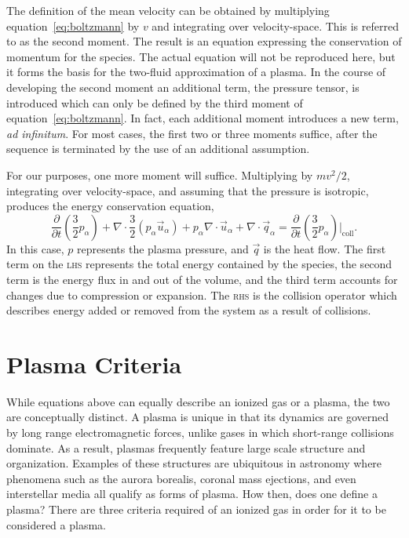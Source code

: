 The definition of the mean velocity can be obtained by multiplying
equation~\ref{eq:boltzmann} by $v$ and integrating over velocity-space. This is
referred to as the second moment. The result is an equation expressing the
conservation of momentum for the species. The actual equation will not be
reproduced here, but it forms the basis for the two-fluid approximation of a
plasma. In the course of developing the second moment an additional term, the
pressure tensor, is introduced which can only be defined by the third moment of
equation~\ref{eq:boltzmann}. In fact, each additional moment introduces a new
term, \emph{ad infinitum}. For most cases, the first two or three moments
suffice, after the sequence is terminated by the use of an additional
assumption.

For our purposes, one more moment will suffice. Multiplying by $mv^2/2$,
integrating over velocity-space, and assuming that the pressure is isotropic,
produces the energy conservation equation,
\begin{equation}
  \frac{\partial}{\partial t}\left(\frac{3}{2}p_\alpha\right) 
  + \nabla\cdot\frac{3}{2} (p_\alpha\vec{u}_\alpha)
  + p_\alpha\nabla\cdot\vec{u}_\alpha
  + \nabla\cdot\vec{q}_\alpha
  = \frac{\partial}{\partial
  t}\left(\frac{3}{2}p_\alpha\right)\bigg|_\mathrm{coll}.
\end{equation}
In this case, $p$ represents the plasma pressure, and $\vec{q}$ is the heat
flow. The first term on the \textsc{lhs} represents the total energy contained
by the species, the second term is the energy flux in and out of the volume, and
the third term accounts for changes due to compression or expansion. The
\textsc{rhs} is the collision operator which describes energy added or removed
from the system as a result of collisions.

\section{Plasma Criteria}
While equations above can equally describe an ionized gas or a plasma, the two
are conceptually distinct. A plasma is unique in that its dynamics are governed
by long range electromagnetic forces, unlike gases in which short-range
collisions dominate. As a result, plasmas frequently feature large scale
structure and organization. Examples of these structures are ubiquitous in
astronomy where phenomena such as the aurora borealis, coronal mass ejections,
and even interstellar media all qualify as forms of plasma. How then, does one
define a plasma? There are three criteria required of an ionized gas in order
for it to be considered a plasma.

